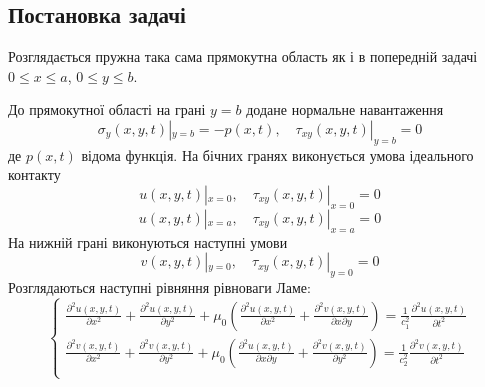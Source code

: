 

\subsection{Постановка задачі}
Розглядається пружна така сама прямокутна область як і в попередній задачі
$0 \le x \le a$, $0 \le y \le b$.

До прямокутної області на грані $y=b$ додане нормальне навантаження
\begin{equation}
    \sigma_y(x, y, t) |_{y=b} = -p(x, t), \quad  \tau_{xy}(x,y,t) |_{y=b} =0
\end{equation}
де $p(x,t)$ відома функція.
На бічних гранях виконується умова ідеального контакту
\begin{equation}
    u(x,y,t) |_{x=0}, \quad \tau_{xy}(x,y,t) |_{x=0} =0
\end{equation}
\begin{equation}
    u(x,y,t) |_{x=a}, \quad \tau_{xy}(x,y,t) |_{x=a} =0
\end{equation}
На нижній грані виконуються наступні умови
\begin{equation}
    v(x,y,t) |_{y=0}, \quad \tau_{xy}(x,y,t) |_{y=0} =0
\end{equation}
Розглядаються наступні рівняння рівноваги Ламе:
\begin{equation}
    \begin{cases}
        \frac{\partial^2 u(x,y,t)}{\partial x^2} + \frac{\partial^2 u(x,y,t)}{\partial y^2} + \mu_0 (\frac{\partial^2 u(x,y,t)}{\partial x^2} + \frac{\partial^2 v(x,y,t)}{\partial x\partial y}) = \frac{1}{c_1^2} \frac{\partial^2 u(x,y,t)}{\partial t^2} \\
        \frac{\partial^2 v(x,y,t)}{\partial x^2} + \frac{\partial^2 v(x,y,t)}{\partial y^2} + \mu_0 (\frac{\partial^2 u(x,y,t)}{\partial x \partial y} + \frac{\partial^2 v(x,y,t)}{\partial y^2}) = \frac{1}{c_2^2} \frac{\partial^2 v(x,y,t)}{\partial t^2} \\
    \end{cases}
\end{equation}

